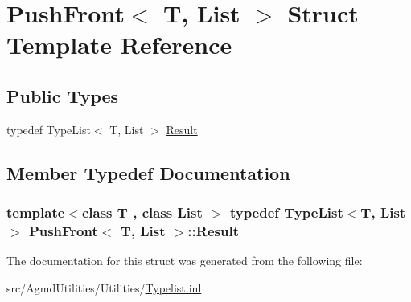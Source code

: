 \hypertarget{struct_push_front}{\section{Push\+Front$<$ T, List $>$ Struct Template Reference}
\label{struct_push_front}
}
\subsection*{Public Types}
\begin{DoxyCompactItemize}
\item 
typedef Type\+List$<$ T, List $>$ \hyperlink{struct_push_front_a21f0c1e408cf7eea2e97d380edb45de2}{Result}
\end{DoxyCompactItemize}


\subsection{Member Typedef Documentation}
\hypertarget{struct_push_front_a21f0c1e408cf7eea2e97d380edb45de2}{
\subsubsection[{Result}]{\setlength{\rightskip}{0pt plus 5cm}template$<$class T , class List $>$ typedef Type\+List$<$T, List$>$ {\bf Push\+Front}$<$ T, List $>$\+::{\bf Result}}}\label{struct_push_front_a21f0c1e408cf7eea2e97d380edb45de2}


The documentation for this struct was generated from the following file\+:\begin{DoxyCompactItemize}
\item 
src/\+Agmd\+Utilities/\+Utilities/\hyperlink{_typelist_8inl}{Typelist.\+inl}\end{DoxyCompactItemize}
